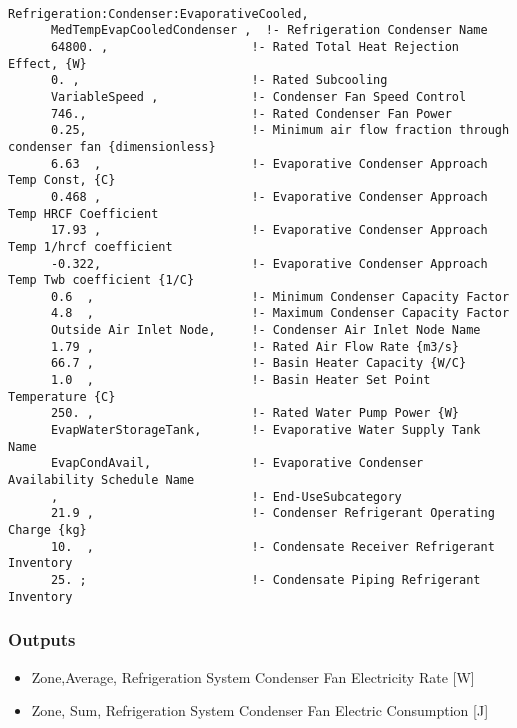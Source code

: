 \begin{lstlisting}

Refrigeration:Condenser:EvaporativeCooled,
      MedTempEvapCooledCondenser ,  !- Refrigeration Condenser Name
      64800. ,                    !- Rated Total Heat Rejection Effect, {W}
      0. ,                        !- Rated Subcooling
      VariableSpeed ,             !- Condenser Fan Speed Control
      746.,                       !- Rated Condenser Fan Power
      0.25,                       !- Minimum air flow fraction through condenser fan {dimensionless}
      6.63  ,                     !- Evaporative Condenser Approach Temp Const, {C}
      0.468 ,                     !- Evaporative Condenser Approach Temp HRCF Coefficient
      17.93 ,                     !- Evaporative Condenser Approach Temp 1/hrcf coefficient
      -0.322,                     !- Evaporative Condenser Approach Temp Twb coefficient {1/C}
      0.6  ,                      !- Minimum Condenser Capacity Factor
      4.8  ,                      !- Maximum Condenser Capacity Factor
      Outside Air Inlet Node,     !- Condenser Air Inlet Node Name
      1.79 ,                      !- Rated Air Flow Rate {m3/s}
      66.7 ,                      !- Basin Heater Capacity {W/C}
      1.0  ,                      !- Basin Heater Set Point Temperature {C}
      250. ,                      !- Rated Water Pump Power {W}
      EvapWaterStorageTank,       !- Evaporative Water Supply Tank Name
      EvapCondAvail,              !- Evaporative Condenser Availability Schedule Name
      ,                           !- End-UseSubcategory
      21.9 ,                      !- Condenser Refrigerant Operating Charge {kg}
      10.  ,                      !- Condensate Receiver Refrigerant Inventory
      25. ;                       !- Condensate Piping Refrigerant Inventory
\end{lstlisting}

\subsubsection{Outputs}\label{outputs-7-008}

\begin{itemize}
\item
  Zone,Average, Refrigeration System Condenser Fan Electricity Rate {[}W{]}
\item
  Zone, Sum, Refrigeration System Condenser Fan Electric Consumption {[}J{]}
\end{itemize}

